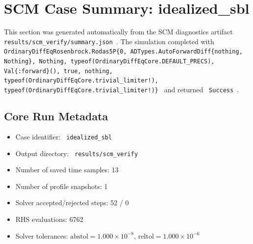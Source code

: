 \section{SCM Case Summary: idealized\_sbl}
\label{sec:scm_case_scm_verify_scm_verify_40x4m_0h_report}

This section was generated automatically from the SCM diagnostics artifact
\texttt{ results/scm\_verify/summary.json }. The simulation completed with \texttt{ OrdinaryDiffEqRosenbrock.Rodas5P\{0, ADTypes.AutoForwardDiff\{nothing, Nothing\}, Nothing, typeof(OrdinaryDiffEqCore.DEFAULT\_PRECS), Val\{:forward\}(), true, nothing, typeof(OrdinaryDiffEqCore.trivial\_limiter!), typeof(OrdinaryDiffEqCore.trivial\_limiter!)\} }
and returned \texttt{ Success }.

\subsection{Core Run Metadata}
\begin{itemize}
  \item Case identifier: \texttt{ idealized\_sbl }
  \item Output directory: \texttt{ results/scm\_verify }
  \item Number of saved time samples: 13
  \item Number of profile snapshots: 1
  \item Solver accepted/rejected steps: 52 / 0
  \item RHS evaluations: 6762
  \item Solver tolerances: $\mathrm{abstol}=1.000 \times 10^{-8}$, $\mathrm{reltol}=1.000 \times 10^{-6}$
\end{itemize}

